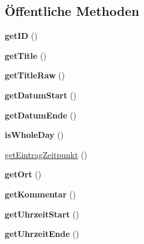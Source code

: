 \subsection*{Öffentliche Methoden}
\begin{DoxyCompactItemize}
\item 
\mbox{\label{class_abstract_termin_af2abc35c030f63b1064ce29403503c4c}} 
{\bfseries get\+ID} ()
\item 
\mbox{\label{class_abstract_termin_ac3908bcb5e154d91f8be40d5d72d71a5}} 
{\bfseries get\+Title} ()
\item 
\mbox{\label{class_abstract_termin_a93b5ffc5d6f183ae1f4c6b7eb0f2b89e}} 
{\bfseries get\+Title\+Raw} ()
\item 
\mbox{\label{class_abstract_termin_a607e668c5891362c50ae9bd8aaf1ebff}} 
{\bfseries get\+Datum\+Start} ()
\item 
\mbox{\label{class_abstract_termin_a15b9cd7746831b24e4a0581872a2f2f9}} 
{\bfseries get\+Datum\+Ende} ()
\item 
\mbox{\label{class_abstract_termin_ad012c22cbf3517f0012e58a4db544d3b}} 
{\bfseries is\+Whole\+Day} ()
\item 
\mbox{\hyperlink{class_abstract_termin_a8fedd7ec0654dd0243bc86821e86e834}{get\+Eintrag\+Zeitpunkt}} ()
\item 
\mbox{\label{class_abstract_termin_a1ca0707c1ed03fc1e624ceb1bed0faee}} 
{\bfseries get\+Ort} ()
\item 
\mbox{\label{class_abstract_termin_a16bcd9089ce96eda67e0334bc2c6f021}} 
{\bfseries get\+Kommentar} ()
\item 
\mbox{\label{class_abstract_termin_a1405071b4acfc3f1927c973aba313454}} 
{\bfseries get\+Uhrzeit\+Start} ()
\item 
\mbox{\label{class_abstract_termin_a17cb473b89b844e05439da9567a04fa0}} 
{\bfseries get\+Uhrzeit\+Ende} ()
\item 

\end{DoxyCompactItemize}
